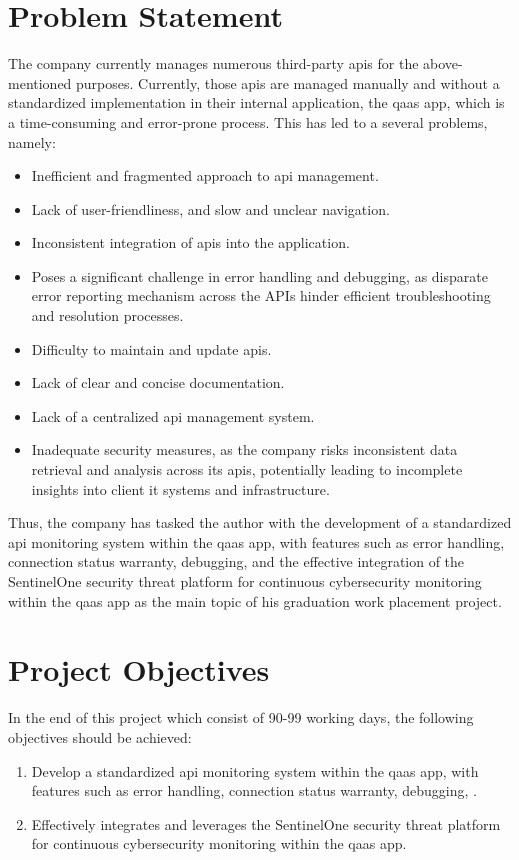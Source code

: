 \begin{multicols}{2}
      \section{Problem Statement}
      The company currently manages numerous third-party \acrshort{api}s for the above-mentioned purposes.
      Currently, those \acrshort{api}s are managed manually and without a standardized implementation in their
      internal application, the \acrshort{qaas} app, which is a time-consuming and error-prone process. This has
      led to a several problems, namely:
      \begin{itemize}
            \item Inefficient and fragmented approach to \acrshort{api} management.
            \item Lack of user-friendliness, and slow and unclear navigation.
            \item Inconsistent integration of \acrshort{api}s into the application.
            \item Poses a significant challenge in error handling and debugging, as disparate error reporting mechanism
                  across the APIs hinder efficient troubleshooting and resolution processes.
            \item Difficulty to maintain and update \acrshort{api}s.
            \item Lack of clear and concise documentation.
            \item Lack of a centralized \acrshort{api} management system.
            \item Inadequate security measures, as the company risks inconsistent data retrieval and analysis across its \acrshort{api}s,
                  potentially leading to incomplete insights into client \acrshort{it} systems and infrastructure.
      \end{itemize}
      Thus, the company has tasked the author with the development of a standardized \acrshort{api} monitoring system within the
      \acrshort{qaas} app, with features such as error handling, connection status warranty, debugging, and the effective integration
      of the SentinelOne security threat platform for continuous cybersecurity monitoring within the \acrshort{qaas} app as the main topic of his
      graduation work placement project.

      \section{Project Objectives}
      In the end of this project which consist of 90-99 working days, the following objectives should be achieved:
      \begin{enumerate}
            \item Develop a standardized \acrshort{api} monitoring system within the \acrshort{qaas} app, with features such as
                  error handling, connection status warranty, debugging, .
            \item Effectively integrates and leverages the SentinelOne security threat platform for continuous
                  cybersecurity monitoring within the \acrshort{qaas} app.
      \end{enumerate}

\end{multicols}
